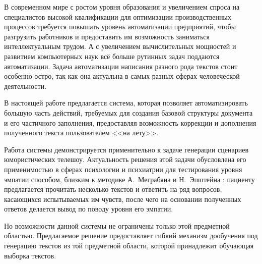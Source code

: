 \Introduction
\label{cha:intro}

В современном мире с ростом уровня образования и увеличением спроса на специалистов высокой квалификации для оптимизации производственных процессов требуется повышать уровень автоматизации предприятий, чтобы разгрузить работников и предоставить им возможность заниматься интеллектуальным трудом. А с увеличением вычислительных мощностей и развитием компьютерных наук всё больше рутинных задач поддаются автоматизации. Задача автоматизации написания разного рода текстов стоит особенно остро, так как она актуальна в самых разных сферах человеческой деятельности.

В настоящей работе предлагается система, которая позволяет автоматизировать большую часть действий, требуемых для создания базовой структуры документа и его частичного заполнения, предоставляя возможность коррекции и дополнения полученного текста пользователем <<на лету>>.

Работа системы демонстрируется применительно к задаче генерации сценариев юмористических телешоу. Актуальность решения этой задачи обусловлена его применимостью в сферах психологии и психиатрии для тестирования уровня эмпатии способом, близким к методике А. Меграбяна и Н. Эпштейна \cite{art:psy_test}: пациенту предлагается прочитать несколько текстов и ответить на ряд вопросов, касающихся испытываемых им чувств, после чего на основании полученных ответов делается вывод по поводу уровня его эмпатии.

Но возможности данной системы не ограничены только этой предметной областью. Предлагаемое решение предоставляет гибкий механизм дообучения под генерацию текстов из той предметной области, которой принадлежит обучающая выборка текстов.